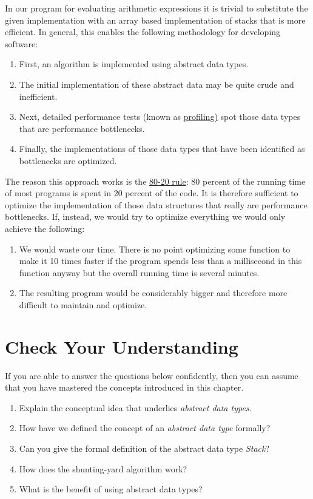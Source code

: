 \begin{enumerate}
       In our program for evaluating  arithmetic expressions it is trivial to substitute the given
       implementation with an array based implementation of stacks that is more efficient.  In general,
       this enables the following methodology for developing software:  
       \begin{enumerate}
       \item First, an algorithm is implemented using abstract data types.
       \item The initial implementation of these abstract data may be quite crude and inefficient.
       \item Next, detailed performance tests (known as 
             \href{http://en.wikipedia.org/wiki/Profiling_(computer_programming)}{profiling)}
             spot those data types that are performance bottlenecks.
       \item Finally, the implementations of those data types that have been identified as bottlenecks are optimized.
       \end{enumerate}
       The reason this approach works is the 
       \href{http://en.wikipedia.org/wiki/Pareto_principle#In_software}{80-20 rule}:  
       80 percent of the running time of most programs is spent in 20 percent of the code.  It is
       therefore sufficient to optimize the 
       implementation of those data structures that really are performance bottlenecks.  If,
       instead, we would try to optimize everything we would only achieve the following:
       \begin{enumerate}
       \item We would waste our time.  There is no point optimizing some function to make it 10 times
             faster if the program spends less than a millisecond in this function anyway but the
             overall running time is several minutes.
       \item The resulting program would be considerably bigger and therefore more difficult to 
             maintain and optimize.
       \end{enumerate}
 \end{enumerate}

\section{Check Your Understanding}
If you are able to answer the questions below confidently, then you can assume that you have mastered the concepts
introduced in this chapter.
\begin{enumerate}
\item Explain the conceptual idea that underlies \emph{abstract data types}.
\item How have we defined the concept of an \emph{abstract data type} formally?
\item Can you give the formal definition of the abstract data type \textsl{Stack}?
\item How does the shunting-yard algorithm work?
\item What is the benefit of using abstract data types?
\end{enumerate}



